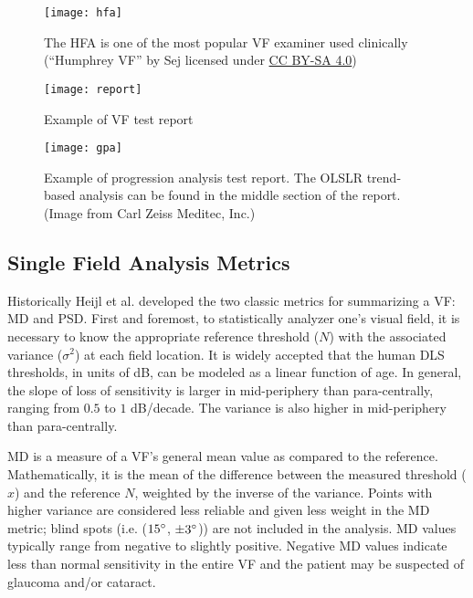 \begin{figure}[t]
	\centering
	\texttt{[image: hfa]}
	\caption[\acl{HFA}]{The \ac{HFA} is one of the most popular \acl{VF} examiner used clinically (``Humphrey VF'' by Sej licensed under \href{https://creativecommons.org/licenses/by-sa/4.0/deed.en}{CC BY-SA 4.0})}
	\label{fig:hfa}
\end{figure} 

\begin{figure}[p]
	\texttt{[image: report]}
	\caption{Example of  \acl{VF} test report}
	\label{fig:report}
\end{figure}

\begin{figure}[p]
	\texttt{[image: gpa]}
	\caption[An \acs{HFA} progression analysis test report]{Example of  progression analysis test report. The \ac{OLSLR} trend-based analysis can be found in the middle section of the report. (Image from Carl Zeiss Meditec, Inc.)}
	\label{fig:gpa}
\end{figure}

\subsection{Single Field Analysis Metrics}

Historically Heijl et al. developed the two classic metrics for summarizing a \acl{VF}: \ac{MD} and \ac{PSD}. \cite{Heijl1987} First and foremost, to statistically analyzer one's visual field, it is necessary to know the appropriate reference threshold ($N$) with the associated variance ($\sigma^2$) at each field location. It is widely accepted that the human \ac{DLS} thresholds, in units of dB, can be modeled as a linear function of age. \cite{Heijl1987a} In general, the slope of loss of sensitivity is larger in mid-periphery than para-centrally, ranging from $0.5$ to $1$ dB/decade. The variance is also higher in mid-periphery than para-centrally. 

\ac{MD} is a measure of a \acl{VF}'s general mean value as compared to the reference. Mathematically, it is the mean of the difference between the measured threshold ($x$) and the reference $N$, weighted by the inverse of the variance. Points with higher variance are considered less reliable and given less weight in the \ac{MD} metric; blind spots (i.e. ($15\degree$, $\pm3\degree$)) are not included in the analysis. MD values typically range from negative to slightly positive. Negative MD values indicate less than normal sensitivity in the entire \acl{VF} and the patient may be suspected of glaucoma and/or cataract.

